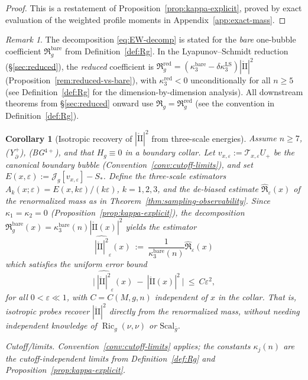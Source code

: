\documentclass[11pt,reqno,a4paper]{amsart}
\numberwithin{equation}{section}
\theoremstyle{plain}
\newtheorem{corollary}[theorem]{Corollary}
\newcommand{\Scal}{\mathrm{Scal}}
\theoremstyle{remark}
\newtheorem{remark}[theorem]{Remark}
\theoremstyle{plain}
\begin{document}
\begin{proof}
This is a restatement of Proposition~\ref{prop:kappa-explicit},
proved by exact evaluation of the weighted profile moments
in Appendix~\ref{app:exact-mass}.
\end{proof}

\begin{remark}
The decomposition \eqref{eq:EW-decomp} is stated for the \emph{bare} one-bubble coefficient
$\mathfrak R_g^{\mathrm{bare}}$ from Definition~\ref{def:Rg}.
In the Lyapunov--Schmidt reduction (\S\ref{sec:reduced}), the \emph{reduced} coefficient is
$\mathfrak R_g^{\mathrm{red}}=(\kappa_3^{\mathrm{bare}}-\delta\kappa_3^{\mathrm{LS}})|\mathring{\mathrm{II}}|^2$
(Proposition~\ref{rem:reduced-vs-bare}),
with $\kappa_3^{\mathrm{red}}<0$ unconditionally for all $n\ge5$
(see Definition~\ref{def:Rg} for the dimension-by-dimension analysis).
All downstream theorems from \S\ref{sec:reduced} onward use $\mathfrak R_g=\mathfrak R_g^{\mathrm{red}}$
(see the convention in Definition~\ref{def:Rg}).
\end{remark}


\begin{corollary}[Isotropic recovery of $|\mathring{\mathrm{II}}|^2$ from three-scale energies]\label{cor:isotropic-Ao-observability}
Assume $n\ge7$, \textup{(Y$^+_{\partial}$)}, \textup{(BG$^{4+}$)}, and that $H_g\equiv0$ in a boundary collar.
Let $v_{x,\varepsilon}:=\mathcal T_{x,\varepsilon}U_+$ be the canonical boundary bubble (Convention~\ref{conv:cutoff-limits}), and set
$E(x,\varepsilon):=\mathcal J_g[v_{x,\varepsilon}]-S_\ast$.
Define the three-scale estimators $A_k(x;\varepsilon)=E(x,k\varepsilon)/(k\varepsilon)$, $k=1,2,3$, and the de-biased estimate $\widehat{\mathfrak R}_\varepsilon(x)$ of the renormalized mass as in Theorem~\ref{thm:sampling-observability}.
Since $\kappa_1=\kappa_2=0$ (Proposition~\ref{prop:kappa-explicit}),
the decomposition $\mathfrak R_g^{\mathrm{bare}}(x) = \kappa_3^{\mathrm{bare}}(n)|\mathring{\mathrm{II}}(x)|^2$
yields the estimator
\begin{equation}\label{eq:Ao-estimator}
\widehat{|\mathring{\mathrm{II}}|^2}_\varepsilon(x)
\ :=\ \frac{1}{\kappa_3^{\mathrm{bare}}(n)}\widehat{\mathfrak R}_\varepsilon(x)
\end{equation}
which satisfies the uniform error bound
\[
\big|\ \widehat{|\mathring{\mathrm{II}}|^2}_\varepsilon(x)\ -\ |\mathring{\mathrm{II}}(x)|^2\ \big|\ \le\ C\varepsilon^2,
\]
for all $0<\varepsilon\ll 1$, with $C=C(M,g,n)$ independent of $x$ in the collar.
That is, isotropic probes recover $|\mathring{\mathrm{II}}|^2$ directly from the
renormalized mass, without needing independent knowledge of
$\operatorname{Ric}_g(\nu,\nu)$ or $\Scal_{\bar g}$.

\emph{Cutoff/limits.} Convention~\ref{conv:cutoff-limits} applies; the constants $\kappa_j(n)$ are the cutoff-independent limits from Definition~\ref{def:Rg} and Proposition~\ref{prop:kappa-explicit}.
\end{corollary}
\end{document}
